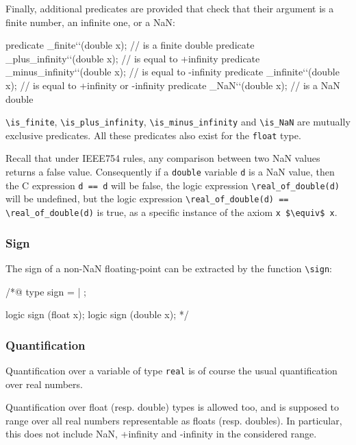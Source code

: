Finally, additional predicates are provided that check that their argument
is a finite number, an infinite one, or a NaN:
\begin{listing}{1}
predicate \is_finite``(double x); // is a finite double
predicate \is_plus_infinity``(double x); // is equal to +infinity
predicate \is_minus_infinity``(double x); // is equal to -infinity
predicate \is_infinite``(double x); // is equal to +infinity or -infinity
predicate \is_NaN``(double x); // is a NaN double
\end{listing}
\lstinline|\is_finite|, \lstinline|\is_plus_infinity|,
\lstinline|\is_minus_infinity| and \lstinline|\is_NaN| are mutually
exclusive predicates.
All these predicates also exist for the \lstinline|float| type.

Recall that under IEEE754 rules, any comparison between two NaN values returns a false value. 
Consequently if a \lstinline|double| variable \lstinline|d| is a  
NaN value, then the C expression \lstinline|d == d| will be 
false, the logic expression \lstinline|\real_of_double(d)| will be undefined,
but the logic expression 
\lstinline|\real_of_double(d) == \real_of_double(d)| is true, as a specific instance of the axiom \lstinline|x $\equiv$ x|.
\subsubsection{Sign}

The sign of a non-NaN floating-point  can be extracted by
the function \lstinline|\sign|:
\begin{listing}{1}
/*@
 type sign = \Positive | \Negative;

 logic sign \sign(float x);
 logic sign \sign(double x);
*/
\end{listing}


\subsubsection{Quantification}

Quantification over a variable of type \lstinline|real| is of course the usual
quantification over real numbers.

Quantification over float (resp. double) types is allowed too, and is
supposed to range over all real numbers representable as floats (resp.
doubles). In particular, this does not include NaN, +infinity and
-infinity in the considered range.


